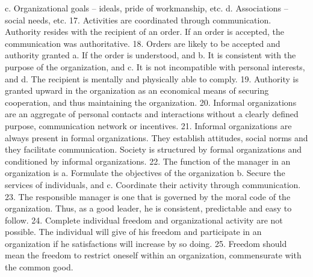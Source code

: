         c. Organizational goals – ideals, pride of workmanship, etc.
        d. Associations – social needs, etc.
    17. Activities are coordinated through communication. Authority resides with the recipient of an order. If an order is accepted, the communication was authoritative.
    18. Orders are likely to be accepted and authority granted
        a. If the order is understood, and
        b. It is consistent with the purpose of the organization, and
        c. It is not incompatible with personal interests, and
        d. The recipient is mentally and physically able to comply.
    19. Authority is granted upward in the organization as an economical means of securing cooperation, and thus maintaining the organization.
    20. Informal organizations are an aggregate of personal contacts and interactions without a clearly defined purpose, communication network or incentives.
    21. Informal organizations are always present in formal organizations. They establish attitudes, social norms and they facilitate communication. Society is structured by formal organizations and conditioned by informal organizations.
    22. The function of the manager in an organization is
        a. Formulate the objectives of the organization
        b. Secure the services of individuals, and 
        c. Coordinate their activity through communication.
    23. The responsible manager is one that is governed by the moral code of the organization. Thus, as a good leader, he is consistent, predictable and easy to follow.
    24. Complete individual freedom and organizational activity are not possible. The individual will give of his freedom and participate in an organization if he satisfactions will increase by so doing.
    25. Freedom should mean the freedom to restrict oneself within an organization, commensurate with the common good.


